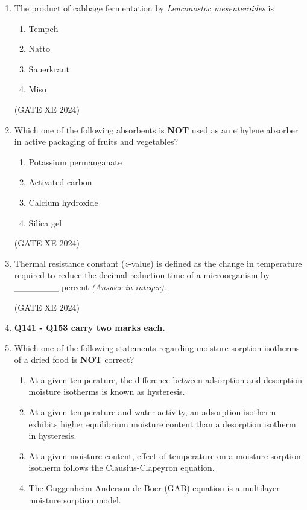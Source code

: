 \documentclass[12pt]{article}
\begin{document}
\begin{enumerate}
(GATE XE 2024)

\item The product of cabbage fermentation by \textit{Leuconostoc mesenteroides} is

\begin{enumerate}
\item Tempeh
\item Natto
\item Sauerkraut
\item Miso
\end{enumerate}

(GATE XE 2024)

\item Which one of the following absorbents is \textbf{NOT} used as an ethylene absorber in active packaging of fruits and vegetables?

\begin{enumerate}
\item Potassium permanganate
\item Activated carbon
\item Calcium hydroxide
\item Silica gel
\end{enumerate}

(GATE XE 2024)

\item Thermal resistance constant ($z$-value) is defined as the change in temperature required to reduce the decimal reduction time of a microorganism by \_\_\_\_\_\_\_ percent \textit{(Answer in integer)}.

(GATE XE 2024)

\item[] \textbf{Q141 - Q153 carry two marks each.}
\item Which one of the following statements regarding moisture sorption isotherms of a dried food is \textbf{NOT} correct?

\begin{enumerate}
\item At a given temperature, the difference between adsorption and desorption moisture isotherms is known as hysteresis.
\item At a given temperature and water activity, an adsorption isotherm exhibits higher equilibrium moisture content than a desorption isotherm in hysteresis.
\item At a given moisture content, effect of temperature on a moisture sorption isotherm follows the Clausius-Clapeyron equation.
\item The Guggenheim-Anderson-de Boer (GAB) equation is a multilayer moisture sorption model.
\end{enumerate}


\end{enumerate}
\end{document}
